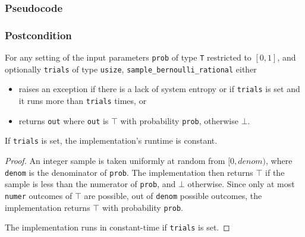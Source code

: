 \documentclass{article}
\begin{document}
\subsubsection*{Pseudocode}



\subsubsection*{Postcondition}
\begin{definition}
    \label{sample-bernoulli}

    For any setting of the input parameters
    \texttt{prob} of type \texttt{T} restricted to $[0, 1]$,
    and optionally \texttt{trials} of type \texttt{usize},
    \texttt{sample\_bernoulli\_rational} either
    \begin{itemize}
        \item raises an exception if there is a lack of system entropy or if \texttt{trials} is set and it runs more than \texttt{trials} times, or
        \item returns \texttt{out} where \texttt{out} is $\top$ with probability \texttt{prob}, otherwise $\bot$.
    \end{itemize}
     If \texttt{trials} is set, the implementation's runtime is constant.    
\end{definition}

\begin{proof} 
An integer sample is taken uniformly at random from $[0, denom)$, where \texttt{denom} is the denominator of \texttt{prob}.
The implementation then returns $\top$ if the sample is less than the numerator of \texttt{prob}, and $\bot$ otherwise.
Since only at most \texttt{numer} outcomes of $\top$ are possible, out of \texttt{denom} possible outcomes,
the implementation returns $\top$ with probability \texttt{prob}.

The implementation runs in constant-time if \texttt{trials} is set.
\end{proof}
\end{document}
